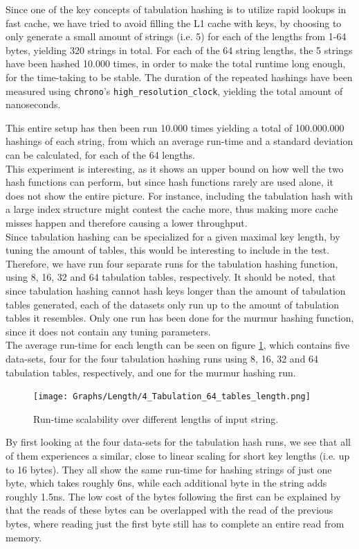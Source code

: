 \documentclass[11pt]{article} %
\begin{document}
Since one of the key concepts of tabulation hashing is to utilize rapid lookups in fast cache, we have tried to avoid filling the L1 cache with keys, by choosing to only generate a small amount of strings (i.e. 5) for each of the lengths from 1-64 bytes, yielding 320 strings in total. For each of the 64 string lengths, the 5 strings have been hashed 10.000 times, in order to make the total runtime long enough, for the time-taking to be stable. The duration of the repeated hashings have been measured using \verb|chrono|'s \verb|high_resolution_clock|, yielding the total amount of nanoseconds. 

This entire setup has then been run 10.000 times yielding a total of 100.000.000 hashings of each string, from which an average run-time and a standard deviation can be calculated, for each of the 64 lengths. \\

This experiment is interesting, as it shows an upper bound on how well the two hash functions can perform, but since hash functions rarely are used alone, it does not show the entire picture. For instance, including the tabulation hash with a large index structure might contest the cache more, thus making more cache misses happen and therefore causing a lower throughput. \\

Since tabulation hashing can be specialized for a given maximal key length, by tuning the amount of tables, this would be interesting to include in the test. Therefore, we have run four separate runs for the tabulation hashing function, using 8, 16, 32 and 64 tabulation tables, respectively. It should be noted, that since tabulation hashing cannot hash keys longer than the amount of tabulation tables generated, each of the datasets only run up to the amount of tabulation tables it resembles. Only one run has been done for the murmur hashing function, since it does not contain any tuning parameters. \\

The average run-time for each length can be seen on figure \ref{fig:tab_length}, which contains five data-sets, four for the four tabulation hashing runs using 8, 16, 32 and 64 tabulation tables, respectively, and one for the murmur hashing run. 

\begin{figure}[H]
  \texttt{[image: Graphs/Length/4\_Tabulation\_64\_tables\_length.png]}\\
  \caption{Run-time scalability over different lengths of input string.}\label{fig:tab_length}
\end{figure}
By first looking at the four data-sets for the tabulation hash runs, we see that all of them experiences a similar, close to linear scaling for short key lengths (i.e. up to 16 bytes). They all show the same run-time for hashing strings of just one byte, which takes roughly 6ns, while each additional byte in the string adds roughly 1.5ns. The low cost of the bytes following the first can be explained by that the reads of these bytes can be overlapped with the read of the previous bytes, where reading just the first byte still has to complete an entire read from memory.\\
\end{document}

